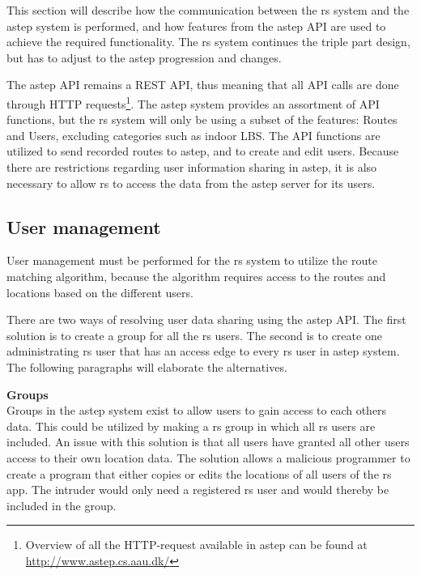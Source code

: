 This section will describe how the communication between the \gls{rs} system and the \gls{astep} system is performed, and how features from the \gls{astep} API are used to achieve the required functionality.
The \gls{rs} system continues the triple part design, but has to adjust to the \gls{astep} progression and changes.

The \gls{astep} API remains a REST API, thus meaning that all API calls are done through HTTP requests\footnote{Overview of all the HTTP-request available in \gls{astep} can be found at \url{http://www.astep.cs.aau.dk/}}.
The \gls{astep} system provides an assortment of API functions, but the \gls{rs} system will only be using a subset of the features: Routes and Users, excluding categories such as indoor LBS.
The API functions are utilized to send recorded routes to \gls{astep}, and to create and edit users.
Because there are restrictions regarding user information sharing in \gls{astep}, it is also necessary to allow \gls{rs} to access the data from the \gls{astep} server for its users.


\subsection{User management}
User management must be performed for the \gls{rs} system to utilize the route matching algorithm, because the algorithm requires access to the routes and locations based on the different users.

There are two ways of resolving user data sharing using the \gls{astep} API.
The first solution is to create a group for all the \gls{rs} users.
The second is to create one administrating \gls{rs} user that has an access edge to every \gls{rs} user in \gls{astep} system.
The following paragraphs will elaborate the alternatives.

\textbf{Groups}\\ 
Groups in the \gls{astep} system exist to allow users to gain access to each others data.
This could be utilized by making a \gls{rs} group in which all \gls{rs} users are included.
An issue with this solution is that all users have granted all other users access to their own location data. 
The solution allows a malicious programmer to create a program that either copies or edits the locations of all users of the \gls{rs} app.
The intruder would only need a registered \gls{rs} user and would thereby be included in the group.

